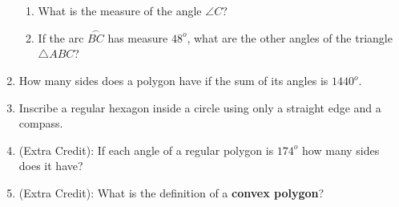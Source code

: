 \documentclass[12pt]{article}
\begin{document}
\begin{enumerate}
\begin{enumerate}
	\item What is the measure of the angle $\angle C$?
	\item If the arc $\stackrel \frown {BC}$ has measure $48^o$, what are the other angles of the triangle $\triangle ABC$?
\end{enumerate}


\item How many sides does a polygon have if the sum of its angles is $1440^o$.

\item Inscribe a regular hexagon inside a circle using only a straight edge and a compass.

\item (Extra Credit): If each angle of a regular polygon is $174^o$ how many sides does it have?

\item (Extra Credit): What is the definition of a \textbf{convex polygon}?

\end{enumerate}
\end{document}
